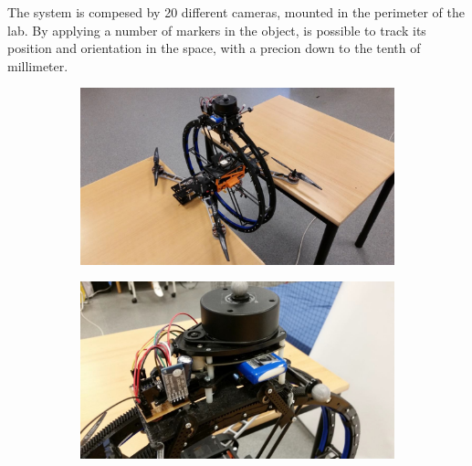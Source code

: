 \noindent The system is compesed by 20 different cameras, mounted in the perimeter of the lab. By applying a number of markers in the object, is possible to track its position and orientation in the space, with a precion down to the tenth of millimeter.

\begin{figure}[h]
	\centering
	\begin{subfigure}[t]{0.49\textwidth}
		\centering
		\includegraphics[scale = 0.22]{images/prometheus2.jpg}
		\label{subfig:prometheus1}
	\end{subfigure} 
	\begin{subfigure}[t]{0.49\textwidth}
		\centering
		\includegraphics[scale = 0.2]{images/prometheus5.jpg}
		\label{subfig:prometheus2}
	\end{subfigure}
	\begin{subfigure}[t]{0.49\textwidth}
		\centering

\end{subfigure}
\end{figure}
